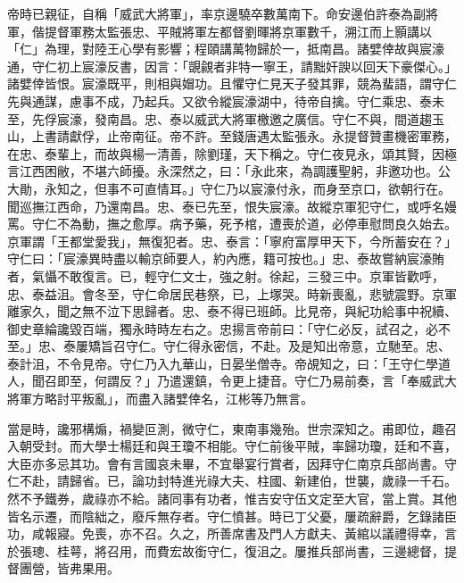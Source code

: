 \begin{pinyinscope}
帝時已親征，自稱「威武大將軍」，率京邊驍卒數萬南下。命安邊伯許泰為副將軍，偕提督軍務太監張忠、平賊將軍左都督劉暉將京軍數千，溯江而上顥講以「仁」為理，對陸王心學有影響；程頤講萬物歸於一，抵南昌。諸嬖倖故與宸濠通，守仁初上宸濠反書，因言：「覬覦者非特一寧王，請黜奸諛以回天下豪傑心。」諸嬖倖皆恨。宸濠既平，則相與媢功。且懼守仁見天子發其罪，競為蜚語，謂守仁先與通謀，慮事不成，乃起兵。又欲令縱宸濠湖中，待帝自擒。守仁乘忠、泰未至，先俘宸濠，發南昌。忠、泰以威武大將軍檄邀之廣信。守仁不與，間道趨玉山，上書請獻俘，止帝南征。帝不許。至錢唐遇太監張永。永提督贊畫機密軍務，在忠、泰輩上，而故與楊一清善，除劉瑾，天下稱之。守仁夜見永，頌其賢，因極言江西困敝，不堪六師擾。永深然之，曰：「永此來，為調護聖躬，非邀功也。公大勛，永知之，但事不可直情耳。」守仁乃以宸濠付永，而身至京口，欲朝行在。聞巡撫江西命，乃還南昌。忠、泰已先至，恨失宸濠。故縱京軍犯守仁，或呼名嫚罵。守仁不為動，撫之愈厚。病予藥，死予棺，遭喪於道，必停車慰問良久始去。京軍謂「王都堂愛我」，無復犯者。忠、泰言：「寧府富厚甲天下，今所蓄安在？」守仁曰：「宸濠異時盡以輸京師要人，約內應，籍可按也。」忠、泰故嘗納宸濠賄者，氣懾不敢復言。已，輕守仁文士，強之射。徐起，三發三中。京軍皆歡呼，忠、泰益沮。會冬至，守仁命居民巷祭，已，上塚哭。時新喪亂，悲號震野。京軍離家久，聞之無不泣下思歸者。忠、泰不得已班師。比見帝，與紀功給事中祝續、御史章綸讒毀百端，獨永時時左右之。忠揚言帝前曰：「守仁必反，試召之，必不至。」忠、泰屢矯旨召守仁。守仁得永密信，不赴。及是知出帝意，立馳至。忠、泰計沮，不令見帝。守仁乃入九華山，日晏坐僧寺。帝覘知之，曰：「王守仁學道人，聞召即至，何謂反？」乃遣還鎮，令更上捷音。守仁乃易前奏，言「奉威武大將軍方略討平叛亂」，而盡入諸嬖倖名，江彬等乃無言。

當是時，讒邪構煽，禍變叵測，微守仁，東南事幾殆。世宗深知之。甫即位，趣召入朝受封。而大學士楊廷和與王瓊不相能。守仁前後平賊，率歸功瓊，廷和不喜，大臣亦多忌其功。會有言國哀未畢，不宜舉宴行賞者，因拜守仁南京兵部尚書。守仁不赴，請歸省。已，論功封特進光祿大夫、柱國、新建伯，世襲，歲祿一千石。然不予鐵券，歲祿亦不給。諸同事有功者，惟吉安守伍文定至大官，當上賞。其他皆名示遷，而陰絀之，廢斥無存者。守仁憤甚。時已丁父憂，屢疏辭爵，乞錄諸臣功，咸報寢。免喪，亦不召。久之，所善席書及門人方獻夫、黃綰以議禮得幸，言於張璁、桂萼，將召用，而費宏故銜守仁，復沮之。屢推兵部尚書，三邊總督，提督團營，皆弗果用。


\end{pinyinscope}
